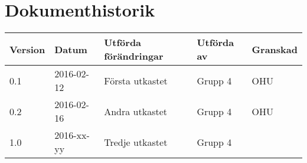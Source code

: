 \documentclass[11pt]{article}
\begin{document}
\tableofcontents

\pagebreak

\section*{Dokumenthistorik}
\begin{table}[h]
\begin{tabular}{|l|l|l|l|l|} \hline

\textbf{Version} & \textbf{Datum} & \textbf{Utförda förändringar} & \textbf{Utförda av} & \textbf{Granskad} \\ \hline
0.1 & 2016-02-12 &  Första utkastet & Grupp 4 & OHU \\ \hline
0.2 & 2016-02-16 & Andra utkastet  & Grupp 4 & OHU \\ \hline
1.0 & 2016-xx-yy & Tredje utkastet  & Grupp 4 &  \\ \hline
\end{tabular}
\end{table}

\pagebreak
{}
\end{document}
